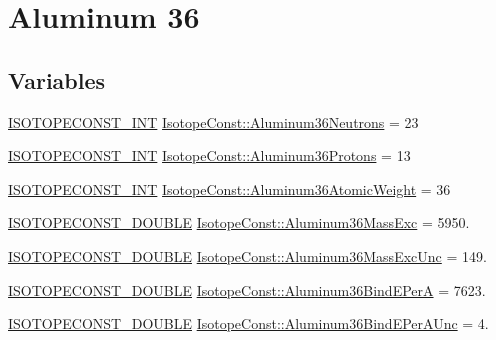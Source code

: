 \hypertarget{group___isotope_const-_aluminum-_al36}{}\section{Aluminum 36}
\label{group___isotope_const-_aluminum-_al36}
\subsection*{Variables}
\begin{DoxyCompactItemize}
\item 
\mbox{\hyperlink{group___isotope_const-_macros_ga5f18360b3e99483a35c32d789e62621c}{I\+S\+O\+T\+O\+P\+E\+C\+O\+N\+S\+T\+\_\+\+I\+NT}} \mbox{\hyperlink{group___isotope_const-_aluminum-_al36_gaaf6a0820f170bb4db19548ccf9c10389}{Isotope\+Const\+::\+Aluminum36\+Neutrons}} = 23
\item 
\mbox{\hyperlink{group___isotope_const-_macros_ga5f18360b3e99483a35c32d789e62621c}{I\+S\+O\+T\+O\+P\+E\+C\+O\+N\+S\+T\+\_\+\+I\+NT}} \mbox{\hyperlink{group___isotope_const-_aluminum-_al36_gab9b38b7bcb5a9df17be0bfedd507dce9}{Isotope\+Const\+::\+Aluminum36\+Protons}} = 13
\item 
\mbox{\hyperlink{group___isotope_const-_macros_ga5f18360b3e99483a35c32d789e62621c}{I\+S\+O\+T\+O\+P\+E\+C\+O\+N\+S\+T\+\_\+\+I\+NT}} \mbox{\hyperlink{group___isotope_const-_aluminum-_al36_ga87aa554574330f5574cc5e5980abdf9f}{Isotope\+Const\+::\+Aluminum36\+Atomic\+Weight}} = 36
\item 
\mbox{\hyperlink{group___isotope_const-_macros_ga8f45a7272ce02c0b4c65c44636ed719a}{I\+S\+O\+T\+O\+P\+E\+C\+O\+N\+S\+T\+\_\+\+D\+O\+U\+B\+LE}} \mbox{\hyperlink{group___isotope_const-_aluminum-_al36_ga4217deaa9f32c25773d619b416627e2b}{Isotope\+Const\+::\+Aluminum36\+Mass\+Exc}} = 5950.
\item 
\mbox{\hyperlink{group___isotope_const-_macros_ga8f45a7272ce02c0b4c65c44636ed719a}{I\+S\+O\+T\+O\+P\+E\+C\+O\+N\+S\+T\+\_\+\+D\+O\+U\+B\+LE}} \mbox{\hyperlink{group___isotope_const-_aluminum-_al36_ga16deb1c411d91becc63dd1228c253b55}{Isotope\+Const\+::\+Aluminum36\+Mass\+Exc\+Unc}} = 149.
\item 
\mbox{\hyperlink{group___isotope_const-_macros_ga8f45a7272ce02c0b4c65c44636ed719a}{I\+S\+O\+T\+O\+P\+E\+C\+O\+N\+S\+T\+\_\+\+D\+O\+U\+B\+LE}} \mbox{\hyperlink{group___isotope_const-_aluminum-_al36_ga49776ccf3216c80b9cc5ff9ffb288fe1}{Isotope\+Const\+::\+Aluminum36\+Bind\+E\+PerA}} = 7623.
\item 
\mbox{\hyperlink{group___isotope_const-_macros_ga8f45a7272ce02c0b4c65c44636ed719a}{I\+S\+O\+T\+O\+P\+E\+C\+O\+N\+S\+T\+\_\+\+D\+O\+U\+B\+LE}} \mbox{\hyperlink{group___isotope_const-_aluminum-_al36_ga56435e8f9173cba6be9bac72ecbec525}{Isotope\+Const\+::\+Aluminum36\+Bind\+E\+Per\+A\+Unc}} = 4.

\end{DoxyCompactItemize}
